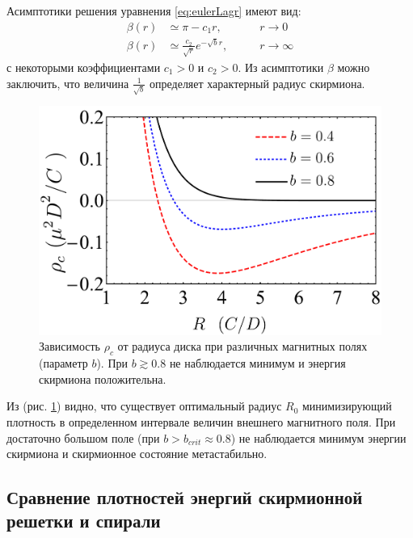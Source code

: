 \documentclass[a4paper,article,14pt]{extarticle}
\begin{document}
Асимптотики решения уравнения \eqref{eq:eulerLagr} имеют вид:
\begin{equation}
\label{eq:asympt_beta}
\begin{aligned}
\beta(r) &\simeq \pi - c_1 r ,\qquad &r \rightarrow 0 \\
\beta(r) &\simeq \frac{c_2}{\sqrt{r}} e^{-\sqrt{b} r} ,\qquad & r \rightarrow \infty
\end{aligned}
\end{equation}
с некоторыми коэффициентами $c_1>0$ и $c_2>0$. Из асимптотики $\beta$ можно заключить, что величина $\frac{1}{\sqrt{b}}$ определяет характерный радиус скирмиона.

\begin{figure}[h]
\centering\includegraphics[width=0.65\paperwidth]{images/plotDensity.pdf}
\caption{Зависимость $\rho _c$ от радиуса диска при различных магнитных полях (параметр $b$). При $b\gtrsim 0.8$ не наблюдается минимум и энергия скирмиона положительна.}
\label{pic:plotDensity}
\end{figure}
Из (рис. \ref{pic:plotDensity}) видно, что существует оптимальный радиус $R_0$ минимизирующий плотность в определенном интервале величин внешнего магнитного поля. При достаточно большом поле (при $b > b_{crit} \approx 0.8$) не наблюдается минимум энергии скирмиона и скирмионное состояние метастабильно.

\subsection{Сравнение плотностей энергий скирмионной решетки и спирали}
\end{document}
